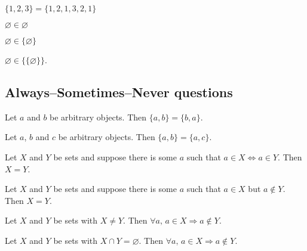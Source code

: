 \begin{chapex}
$\{ 1, 2, 3 \} = \{ 1, 2, 1, 3, 2, 1 \}$
\end{chapex}

\begin{chapex}
$\varnothing \in \varnothing$
\end{chapex}

\begin{chapex}
$\varnothing \in \{ \varnothing \}$
\end{chapex}

\begin{chapex}
\label{cqSetsTFEnd}
$\varnothing \in \{ \{ \varnothing \} \}$.
\end{chapex}

\subsection*{Always--Sometimes--Never questions}


\begin{chapex} %
\label{cqSetsASNBegin}
Let $a$ and $b$ be arbitrary objects. Then $\{ a, b \} = \{ b, a \}$.
\end{chapex}

\begin{chapex} %
Let $a$, $b$ and $c$ be arbitrary objects. Then $\{ a, b \} = \{ a, c \}$.
\end{chapex}

\begin{chapex} %
Let $X$ and $Y$ be sets and suppose there is some $a$ such that $a \in X \Leftrightarrow a \in Y$. Then $X = Y$.
\end{chapex}

\begin{chapex} %
Let $X$ and $Y$ be sets and suppose there is some $a$ such that $a \in X$ but $a \not\in Y$. Then $X = Y$.
\end{chapex}

\begin{chapex} %
Let $X$ and $Y$ be sets with $X \ne Y$. Then $\forall a,\, a \in X \Rightarrow a \not\in Y$.
\end{chapex}

\begin{chapex} %
Let $X$ and $Y$ be sets with $X \cap Y = \varnothing$. Then $\forall a,\, a \in X \Rightarrow a \not\in Y$.
\end{chapex}

